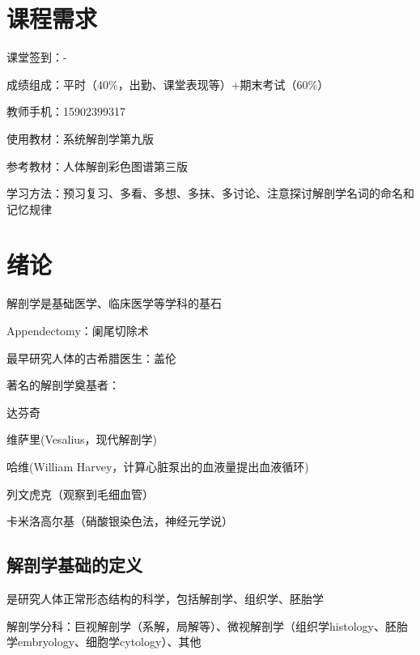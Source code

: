 \def\lecturer{周见至}
\def\noter{THF}
\def\term{III-B}
\def\className{Human Anatomy}



\maketitle
\tableofcontents
\section*{课程需求}%
\label{sec:课程需求}
课堂签到：-

成绩组成：平时（40\%，出勤、课堂表现等）+期末考试（60\%）

教师手机：15902399317

使用教材：系统解剖学第九版

参考教材：人体解剖彩色图谱第三版

学习方法：预习复习、多看、多想、多抹、多讨论、注意探讨解剖学名词的命名和记忆规律
\section{绪论}%
\label{sec:绪论}
解剖学是基础医学、临床医学等学科的基石
\begin{notation}
    Appendectomy：阑尾切除术
\end{notation}
\begin{notation}
    最早研究人体的古希腊医生：盖伦
\end{notation}
\begin{notation}
    著名的解剖学奠基者：

    达芬奇
    
    维萨里(Vesalius，现代解剖学)
    
    哈维(William Harvey，计算心脏泵出的血液量提出血液循环)
    
    列文虎克（观察到毛细血管）
    
    卡米洛高尔基（硝酸银染色法，神经元学说）
\end{notation}
\subsection{解剖学基础的定义}%
\label{sub:解剖学基础的定义}
是研究人体正常形态结构的科学，包括解剖学、组织学、胚胎学

解剖学分科：巨视解剖学（系解，局解等）、微视解剖学（组织学histology、胚胎学embryology、细胞学cytology）、其他

